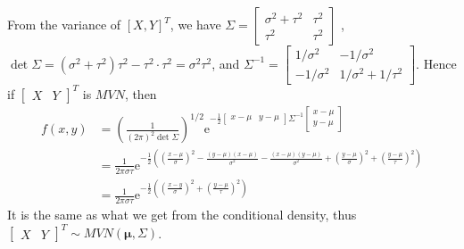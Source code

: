 \documentclass{article}
\begin{document}
\begin{enumerate}[leftmargin = 0 em, label = \arabic*., font = \bfseries]
\begin{enumerate}
 	From the variance of $[X,Y]^T$, we have $\Sigma = \begin{bmatrix}
 		\sigma^2 + \tau^2 & \tau^2\\
 		\tau^2 & \tau^2
 	\end{bmatrix}$ , $\det \Sigma = (\sigma^2 + \tau^2)\tau^2 - \tau^2 \cdot \tau^2 = \sigma^2 \tau^2$, and $\Sigma^{-1} = \begin{bmatrix}
 		1/\sigma^2 & - 1/\sigma^2\\
 		- 1 /\sigma^2 & 1/\sigma^2 + 1/\tau^2
 	\end{bmatrix}.$ Hence if $\begin{bmatrix}
 		X & Y
 	\end{bmatrix}^T$ is $MVN$, then
 	\begin{align*}
 	f(x,y)& = \left(\frac{1}{(2 \pi)^2 \det \Sigma}\right)^{1/2} \mathrm{e}^{- \frac{1}{2}\begin{bmatrix}
 		x - \mu & y - \mu
 	\end{bmatrix} \Sigma^{-1} \begin{bmatrix}
 		x - \mu\\
 		y - \mu
 	\end{bmatrix}}\\
 	& = \frac{1}{2 \pi \sigma \tau} \mathrm{e}^{-\frac{1}{2} ((\frac{x - \mu}{\sigma})^2 - \frac{(y - \mu)(x - \mu)}{\sigma^2} - \frac{(x - \mu)(y - \mu)}{\sigma^2} + (\frac{y - \mu}{\sigma})^2 + (\frac{y - \mu}{\tau})^2)}\\
 	& = \frac{1}{2 \pi \sigma \tau} \mathrm{e}^{-\frac{1}{2}((\frac{x - y}{\sigma})^2 + (\frac{y - \mu}{\tau})^2)}
 	\end{align*}
 	It is the same as what we get from the conditional density, thus $\begin{bmatrix}
 		X & Y
 	\end{bmatrix}^T \sim MVN(\bm \mu, \Sigma)$.
 	\end{enumerate}
 	
 	
 	
 	
 	
	
	
 	\end{enumerate}






	
	
\end{document}
